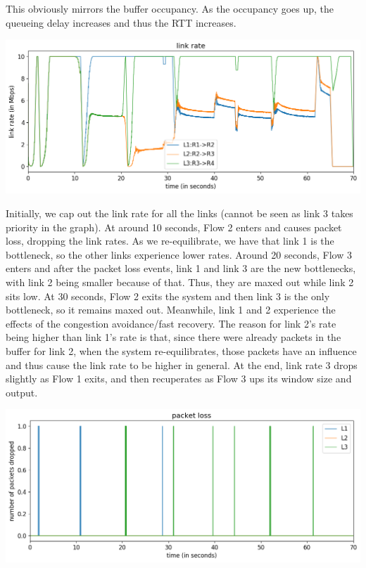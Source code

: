 \documentclass{article}
\begin{document}
This obviously mirrors the buffer occupancy. As the occupancy goes up, the queueing delay increases and thus the RTT increases.

\includegraphics[width = \textwidth]{"test_case2_reno link rate"}

Initially, we cap out the link rate for all the links (cannot be seen as link 3 takes priority in the graph). At around 10 seconds, Flow 2 enters and causes packet loss, dropping the link rates. As we re-equilibrate, we have that link 1 is the bottleneck, so the other links experience lower rates. Around 20 seconds, Flow 3 enters and after the packet loss events, link 1 and link 3 are the new bottlenecks, with link 2 being smaller because of that. Thus, they are maxed out while link 2 sits low. At 30 seconds, Flow 2 exits the system and then link 3 is the only bottleneck, so it remains maxed out. Meanwhile, link 1 and 2 experience the effects of the congestion avoidance/fast recovery. The reason for link 2's rate being higher than link 1's rate is that, since there were already packets in the buffer for link 2, when the system re-equilibrates, those packets have an influence and thus cause the link rate to be higher in general. At the end, link rate 3 drops slightly as Flow 1 exits, and then recuperates as Flow 3 ups its window size and output.

\includegraphics[width = \textwidth]{"test_case2_reno packet loss"}
\end{document}
